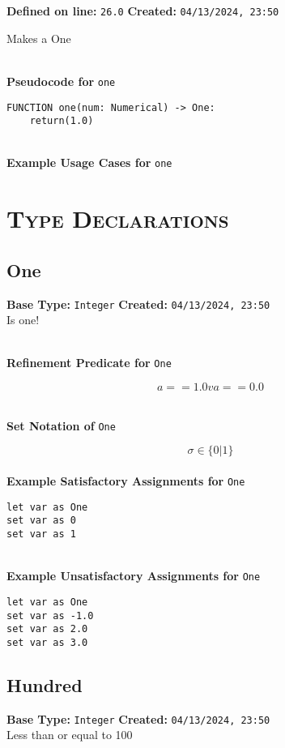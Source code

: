 \documentclass{article}
\begin{document}
\textbf{Defined on line:} \verb|26.0| \hfill \textbf{Created:} \verb|04/13/2024, 23:50| 


Makes a One

\textbf{\\ Pseudocode for } \texttt{one}
\begin{verbatim}
FUNCTION one(num: Numerical) -> One:
	return(1.0)
\end{verbatim}

\textbf{\\ Example Usage Cases for } \texttt{one}
\clearpage

\section{\textsc{Type Declarations}}

\subsection{One}
\textbf{Base Type:} \verb|Integer| \hfill \textbf{Created:} \verb|04/13/2024, 23:50| \\
Is one!

\textbf{\\ Refinement Predicate for } \texttt{One}

$$ a == 1.0 v a == 0.0 $$

\textbf{\\ Set Notation of } \texttt{One}

$$\sigma \in \{ 0 | 1 \}$$ \ \
\textbf{\\ Example Satisfactory Assignments for } \texttt{One}
\begin{verbatim}
let var as One
set var as 0
set var as 1
\end{verbatim}


\textbf{\\ Example Unsatisfactory Assignments for } \texttt{One}
\begin{verbatim}
let var as One
set var as -1.0
set var as 2.0
set var as 3.0
\end{verbatim}


\clearpage

\subsection{Hundred}
\textbf{Base Type:} \verb|Integer| \hfill \textbf{Created:} \verb|04/13/2024, 23:50| \\
Less than or equal to 100
\end{document}
